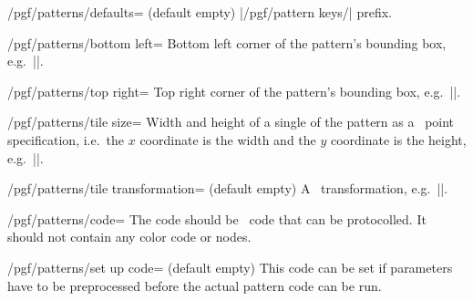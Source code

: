\begin{command}{\pgfdeclarepattern{}}
\begin{key}{/pgf/patterns/defaults= (default empty)}
        |/pgf/pattern keys/| prefix.
    \end{key}
    \begin{key}{/pgf/patterns/bottom left=}
        Bottom left corner of the pattern's bounding box, e.g.\
        |\pgfqpoint{-.1pt}{-.1pt}|.
    \end{key}
    \begin{key}{/pgf/patterns/top right=}
        Top right corner of the pattern's bounding box, e.g.\
        |\pgfqpoint{3.1pt}{3.1pt}|.
    \end{key}
    \begin{key}{/pgf/patterns/tile size=}
        Width and height of a single of the pattern as a \pgfname\ point
        specification, i.e.\ the $x$ coordinate is the width and the $y$
        coordinate is the height, e.g.\ |\pgfqpoint{3pt}{3pt}|.
    \end{key}
    \begin{key}{/pgf/patterns/tile transformation= (default empty)}
        A \pgfname\ transformation, e.g.\ ||.
    \end{key}
    \begin{key}{/pgf/patterns/code=}
        The code should be \pgfname\ code that can be protocolled. It should not
        contain any color code or nodes.
    \end{key}
    \begin{key}{/pgf/patterns/set up code= (default empty)}
        This code can be set if parameters have to be preprocessed before the
        actual pattern code can be run.
    \end{key}
\end{command}

